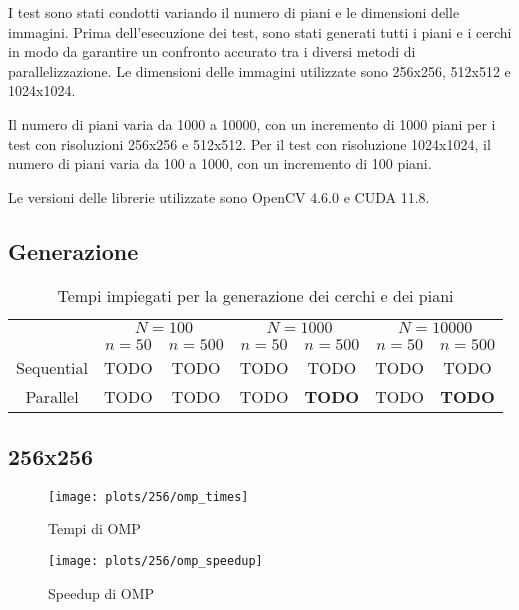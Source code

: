 I test sono stati condotti variando il numero di piani e le dimensioni delle immagini.
Prima dell'esecuzione dei test, sono stati generati tutti i piani e i cerchi in modo da garantire un confronto accurato
tra i diversi metodi di parallelizzazione.
Le dimensioni delle immagini utilizzate sono 256x256, 512x512 e 1024x1024.

Il numero di piani varia da 1000 a 10000, con un incremento di 1000 piani per i test con risoluzioni 256x256 e 512x512.
Per il test con risoluzione 1024x1024, il numero di piani varia da 100 a 1000, con un incremento di 100 piani.

Le versioni delle librerie utilizzate sono OpenCV 4.6.0 e CUDA 11.8.

\subsection{Generazione}\label{subsec:generazione}
\begin{table}[H]
    \centering
    \begin{tabular}{c|c|c|c|c|c|c|}
        & \multicolumn{2}{|c|}{$N = 100$} & \multicolumn{2}{|c|}{$N = 1000$} & \multicolumn{2}{|c|}{$N = 10000$} \\
        & $n=50$ & $n=500$ & $n=50$ & $n=500$ & $n=50$ & $n=500$ \\
        \hline
        Sequential & TODO & TODO & TODO & TODO & TODO & TODO \\
        Parallel & TODO & TODO & TODO & \textbf{TODO} & TODO & \textbf{TODO} \\
    \end{tabular}
    \caption{\label{tab:gen}Tempi impiegati per la generazione dei cerchi e dei piani}
\end{table}

\subsection{256x256}\label{subsec:256x256}
\begin{figure}[H]
    \centering
    \begin{minipage}{0.49\textwidth}
        \centering
        \texttt{[image: plots/256/omp\_times]}
        \caption{Tempi di OMP}\label{fig:times-256-omp}
    \end{minipage}
    \begin{minipage}{0.49\textwidth}
        \centering
        \texttt{[image: plots/256/omp\_speedup]}
        \caption{Speedup di OMP}\label{fig:speedup-256-omp}
    \end{minipage}
\end{figure}

